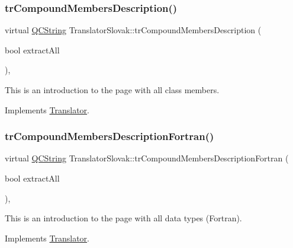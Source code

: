 \subsubsection{\texorpdfstring{trCompoundMembersDescription()}{trCompoundMembersDescription()}}
{\footnotesize\ttfamily virtual \mbox{\hyperlink{class_q_c_string}{Q\+C\+String}} Translator\+Slovak\+::tr\+Compound\+Members\+Description (\begin{DoxyParamCaption}\item[{bool}]{extract\+All }\end{DoxyParamCaption})\hspace{0.3cm}{\ttfamily [inline]}, {\ttfamily [virtual]}}

This is an introduction to the page with all class members. 

Implements \mbox{\hyperlink{class_translator}{Translator}}.

\mbox{\label{class_translator_slovak_a58b1430d35000fa15e83513bba79aece}} 
\subsubsection{\texorpdfstring{trCompoundMembersDescriptionFortran()}{trCompoundMembersDescriptionFortran()}}
{\footnotesize\ttfamily virtual \mbox{\hyperlink{class_q_c_string}{Q\+C\+String}} Translator\+Slovak\+::tr\+Compound\+Members\+Description\+Fortran (\begin{DoxyParamCaption}\item[{bool}]{extract\+All }\end{DoxyParamCaption})\hspace{0.3cm}{\ttfamily [inline]}, {\ttfamily [virtual]}}

This is an introduction to the page with all data types (Fortran). 

Implements \mbox{\hyperlink{class_translator}{Translator}}.

\mbox{\label{class_translator_slovak_a7d75173be00da349fec8c59a68ddf32e}} 
